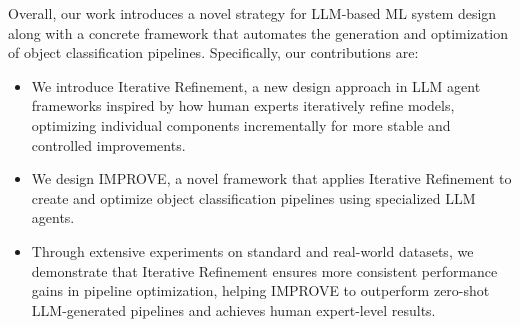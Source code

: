 Overall, our work introduces a novel strategy for LLM-based ML system design along with a concrete framework that automates the generation and optimization of object classification pipelines. Specifically, our contributions are:
\begin{itemize}
    \item We introduce Iterative Refinement, a new design approach in LLM agent frameworks inspired by how human experts iteratively refine models, optimizing individual components incrementally for more stable and controlled improvements.
    \item We design IMPROVE, a novel framework that applies Iterative Refinement to create and optimize object classification pipelines using specialized LLM agents.
    \item Through extensive experiments on standard and real-world datasets, we demonstrate that Iterative Refinement ensures more consistent performance gains in pipeline optimization, helping IMPROVE to outperform zero-shot LLM-generated pipelines and achieves human expert-level results.
\end{itemize} 